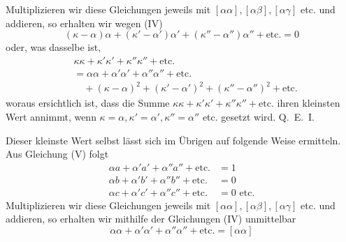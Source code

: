 Multiplizieren wir diese Gleichungen jeweils mit \([\alpha\alpha],[\alpha\beta],[\alpha\gamma]\) etc. und addieren, so erhalten wir wegen (IV)
\[
(\kappa-\alpha)\alpha+(\kappa'-\alpha')\alpha'+(\kappa''-\alpha'')\alpha''+\text{etc.}=0
\]
oder, was dasselbe ist,
\[
\begin{aligned}
&\kappa\kappa+\kappa'\kappa'+\kappa''\kappa''+\text{etc.}\\
&=\alpha\alpha+\alpha'\alpha'+\alpha''\alpha''+\text{etc.}{}\\
&\quad+(\kappa-\alpha)^2+(\kappa'-\alpha')^2+(\kappa''-\alpha'')^2+\text{etc.}
\end{aligned}
\]
woraus ersichtlich ist, dass die Summe \(\kappa\kappa+\kappa'\kappa'+\kappa''\kappa''+\text{etc.}\) ihren kleinsten Wert annimmt, wenn \(\kappa=\alpha,\kappa'=\alpha',\kappa''=\alpha''\) etc. gesetzt wird. Q.~E.~I.

Dieser kleinste Wert selbst lässt sich im Übrigen auf folgende Weise ermitteln. Aus Gleichung (V) folgt
\[
\begin{aligned}
\alpha a+\alpha'a'+\alpha''a''+\text{etc.}&=1\\
\alpha b+\alpha'b'+\alpha''b''+\text{etc.}&=0\\
\alpha c+\alpha'c'+\alpha''c''+\text{etc.}&=0\text{ etc.}
\end{aligned}
\]
Multiplizieren wir diese Gleichungen jeweils mit \([\alpha\alpha],[\alpha\beta],[\alpha\gamma]\) etc. und addieren, so erhalten wir mithilfe der Gleichungen (IV) unmittelbar
\[
\alpha\alpha+\alpha'\alpha'+\alpha''\alpha''+\text{etc.}=[\alpha\alpha]
\]

\clearpage

